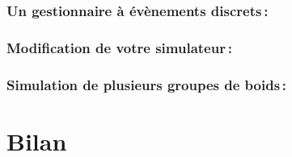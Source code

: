 \documentclass[a4paper, 10pt, french]{article}
\begin{document}
    \subsubsection{Un gestionnaire à évènements discrets\,:} 
      {
      
      } 
    \subsubsection{Modification de votre simulateur\,: } 
      {
       
      }
      \subsubsection{Simulation de plusieurs groupes de boids\,: } 
      {
      
      }

\section{Bilan}
{

}
\end{document}
